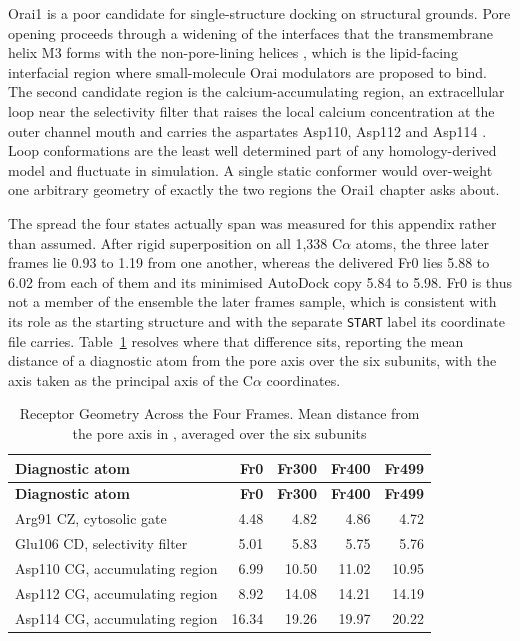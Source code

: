 Orai1 is a poor candidate for single-structure docking on structural grounds. Pore opening proceeds through a widening of the interfaces that the transmembrane helix M3 forms with the non-pore-lining helices \cite{ref072}, which is the lipid-facing interfacial region where small-molecule Orai modulators are proposed to bind. The second candidate region is the calcium-accumulating region, an extracellular loop near the selectivity filter that raises the local calcium concentration at the outer channel mouth and carries the aspartates Asp110, Asp112 and Asp114 \cite{ref038}. Loop conformations are the least well determined part of any homology-derived model and fluctuate in simulation. A single static conformer would over-weight one arbitrary geometry of exactly the two regions the Orai1 chapter asks about.

The spread the four states actually span was measured for this appendix rather than assumed. After rigid superposition on all 1,338 C\ensuremath{\alpha} atoms, the three later frames lie 0.93 to 1.19\angstrom{} from one another, whereas the delivered Fr0 lies 5.88 to 6.02\angstrom{} from each of them and its minimised AutoDock copy 5.84 to 5.98\angstrom{}. Fr0 is thus not a member of the ensemble the later frames sample, which is consistent with its role as the starting structure and with the separate \texttt{START} label its coordinate file carries. Table~\ref{tab:appendix-frame-geometry} resolves where that difference sits, reporting the mean distance of a diagnostic atom from the pore axis over the six subunits, with the axis taken as the principal axis of the C\ensuremath{\alpha} coordinates.

\begingroup
\scriptsize
\begin{longtable}[]{@{}lrrrr@{}}
\caption[Receptor Geometry Across the Four Frames]{Receptor Geometry Across the Four Frames. Mean distance from the pore axis in \angstrom{}, averaged over the six subunits}\label{tab:appendix-frame-geometry}\tabularnewline
\toprule\noalign{}
\textbf{Diagnostic atom} & \textbf{Fr0} & \textbf{Fr300} & \textbf{Fr400} & \textbf{Fr499} \\
\midrule\noalign{}
\endfirsthead
\toprule\noalign{}
\textbf{Diagnostic atom} & \textbf{Fr0} & \textbf{Fr300} & \textbf{Fr400} & \textbf{Fr499} \\
\midrule\noalign{}
\endhead
\bottomrule\noalign{}
\endlastfoot
Arg91 CZ, cytosolic gate & 4.48 & 4.82 & 4.86 & 4.72 \\
Glu106 CD, selectivity filter & 5.01 & 5.83 & 5.75 & 5.76 \\
Asp110 CG, accumulating region & 6.99 & 10.50 & 11.02 & 10.95 \\
Asp112 CG, accumulating region & 8.92 & 14.08 & 14.21 & 14.19 \\
Asp114 CG, accumulating region & 16.34 & 19.26 & 19.97 & 20.22 \\
\end{longtable}
\endgroup

